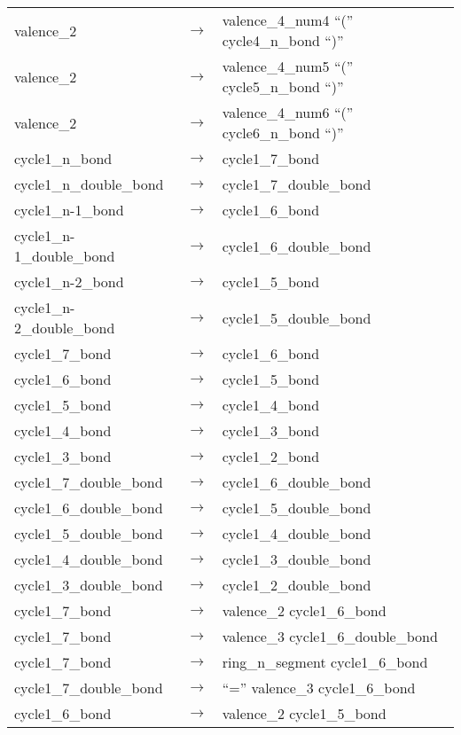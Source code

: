 \begin{longtable}{m{} p{} p{}}
    valence\_2 & $\rightarrow$ & valence\_4\_num4 ``('' cycle4\_n\_bond ``)'' \\
    valence\_2 & $\rightarrow$ & valence\_4\_num5 ``('' cycle5\_n\_bond ``)'' \\
    valence\_2 & $\rightarrow$ & valence\_4\_num6 ``('' cycle6\_n\_bond ``)'' \\
    cycle1\_n\_bond & $\rightarrow$ & cycle1\_7\_bond \\
    cycle1\_n\_double\_bond & $\rightarrow$ & cycle1\_7\_double\_bond \\
    cycle1\_n-1\_bond & $\rightarrow$ & cycle1\_6\_bond \\
    cycle1\_n-1\_double\_bond & $\rightarrow$ & cycle1\_6\_double\_bond \\
    cycle1\_n-2\_bond & $\rightarrow$ & cycle1\_5\_bond \\
    cycle1\_n-2\_double\_bond & $\rightarrow$ & cycle1\_5\_double\_bond \\
    cycle1\_7\_bond & $\rightarrow$ & cycle1\_6\_bond \\
    cycle1\_6\_bond & $\rightarrow$ & cycle1\_5\_bond \\
    cycle1\_5\_bond & $\rightarrow$ & cycle1\_4\_bond \\
    cycle1\_4\_bond & $\rightarrow$ & cycle1\_3\_bond \\
    cycle1\_3\_bond & $\rightarrow$ & cycle1\_2\_bond \\
    cycle1\_7\_double\_bond & $\rightarrow$ & cycle1\_6\_double\_bond \\
    cycle1\_6\_double\_bond & $\rightarrow$ & cycle1\_5\_double\_bond \\
    cycle1\_5\_double\_bond & $\rightarrow$ & cycle1\_4\_double\_bond \\
    cycle1\_4\_double\_bond & $\rightarrow$ & cycle1\_3\_double\_bond \\
    cycle1\_3\_double\_bond & $\rightarrow$ & cycle1\_2\_double\_bond \\
    cycle1\_7\_bond & $\rightarrow$ & valence\_2 cycle1\_6\_bond \\
    cycle1\_7\_bond & $\rightarrow$ & valence\_3 cycle1\_6\_double\_bond \\
    cycle1\_7\_bond & $\rightarrow$ & ring\_n\_segment cycle1\_6\_bond \\
    cycle1\_7\_double\_bond & $\rightarrow$ & ``='' valence\_3 cycle1\_6\_bond \\
    cycle1\_6\_bond & $\rightarrow$ & valence\_2 cycle1\_5\_bond \\

\end{longtable}
